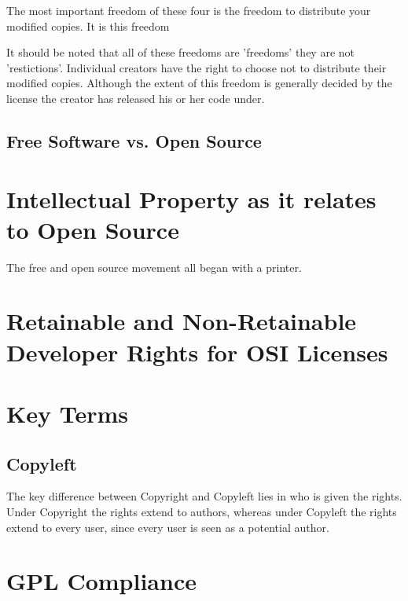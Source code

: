\documentclass[12pt,letterpaper]{article}
\begin{document}
The most important freedom of these four is the freedom to distribute
your modified copies. It is this freedom

It should be noted that all of these freedoms are 'freedoms' they are
not 'restictions'. Individual creators have the right to choose not to
distribute their modified copies. Although the extent of this freedom is
generally decided by the license the creator has released his or her
code under.

\subsection{Free Software vs. Open Source}


\section{Intellectual Property as it relates to Open Source}
The free and open source movement all began with a printer.


\section{Retainable and Non-Retainable Developer Rights for OSI Licenses}


\section{Key Terms}
\subsection{Copyleft}
The key difference between Copyright and Copyleft lies in who is given
the rights. Under Copyright the rights extend to authors, whereas under
Copyleft the rights extend to every user, since every user is seen as a
potential author.


\section{GPL Compliance}


\end{document}
